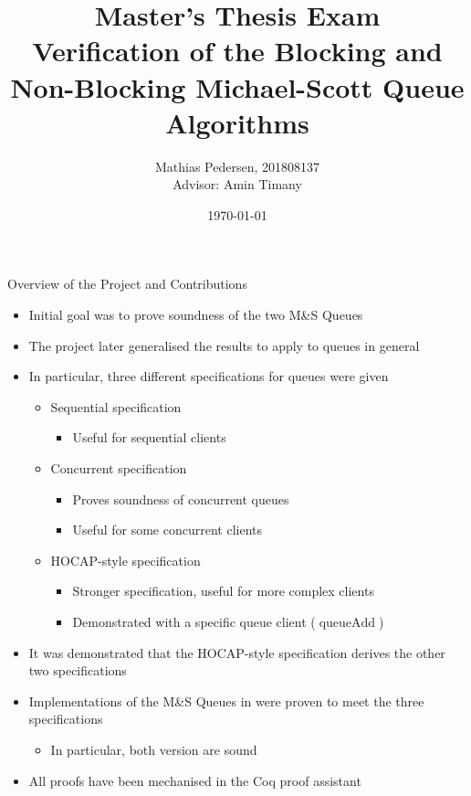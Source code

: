 \documentclass[9pt]{beamer}
\title{Master's Thesis Exam\\
Verification of the Blocking and Non-Blocking Michael-Scott Queue Algorithms}
\author{
  Mathias Pedersen, 201808137 \texorpdfstring{\\}{with}
  {\small Advisor: Amin Timany}
}
\institute{Aarhus University}
\date{\today}
\newcommand{\queueAdd}{\operatorname{queueAdd}}
\newcommand{\msq}{M\&S Queue}
\begin{document}
\frame{\titlepage}


\begin{frame}{Overview of the Project and Contributions}
  \begin{itemize}
    \item Initial goal was to prove soundness of the two \msq{}s
    \item The project later generalised the results to apply to queues in general
    \item In particular, three different specifications for queues were given
    \begin{itemize}
      \item Sequential specification
        \begin{itemize}
          \item Useful for sequential clients
        \end{itemize}
      \item Concurrent specification
        \begin{itemize}
          \item Proves soundness of concurrent queues
          \item Useful for some concurrent clients
        \end{itemize}
      \item HOCAP-style specification
        \begin{itemize}
          \item Stronger specification, useful for more complex clients
          \item Demonstrated with a specific queue client ($\queueAdd$)
        \end{itemize}
    \end{itemize}
    \item It was demonstrated that the HOCAP-style specification derives the other two specifications
    \item Implementations of the \msq{}s in \heaplang{} were proven to meet the three specifications
      \begin{itemize}
        \item In particular, both version are sound
      \end{itemize}
    \item All proofs have been mechanised in the Coq proof assistant
  \end{itemize}
\end{frame}
\end{document}
